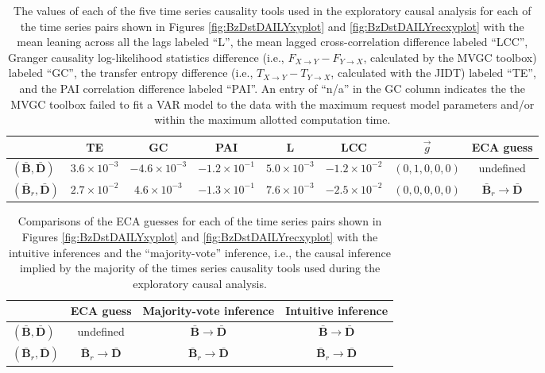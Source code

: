 \documentclass{article}[10pt]
\begin{document}
\begin{table}
\begin{center}
\begin{tabular}{lccccccc}
  & TE & GC & PAI & L & LCC & $\vec{g}$ & ECA guess\\
\midrule
$(\bar{\mathbf{B}},\bar{\mathbf{D}})$ & $3.6\times 10^{-3}$ & $-4.6\times 10^{-3}$ & $-1.2\times 10^{-1}$ & $5.0\times 10^{-3}$ & $-1.2\times 10^{-2}$ & $(0,1,0,0,0)$ & undefined\\
$(\bar{\mathbf{B}}_r,\bar{\mathbf{D}})$ & $2.7\times 10^{-2}$ & $4.6\times 10^{-3}$ & $-1.3\times 10^{-1}$ & $7.6\times 10^{-3}$ & $-2.5\times 10^{-2}$ & $(0,0,0,0,0)$ & $\bar{\mathbf{B}}_r\rightarrow\bar{\mathbf{D}}$
\end{tabular}
\caption{The values of each of the five time series causality tools used in the exploratory causal analysis for each of the time series pairs shown in Figures \ref{fig:BzDstDAILYxyplot} and \ref{fig:BzDstDAILYrecxyplot} with the mean leaning across all the lags labeled ``L'', the mean lagged cross-correlation difference labeled ``LCC'', Granger causality log-likelihood statistics difference (i.e., $F_{X\rightarrow Y}-F_{Y\rightarrow X}$, calculated by the MVGC toolbox) labeled ``GC'', the transfer entropy difference (i.e., $T_{X\rightarrow Y}-T_{Y\rightarrow X}$, calculated with the JIDT) labeled ``TE'', and the PAI correlation difference labeled ``PAI''.  An entry of ``n/a'' in the GC column indicates the the MVGC toolbox failed to fit a VAR model to the data with the maximum request model parameters and/or within the maximum allotted computation time.}
\label{tab:SolEx}
\end{center}
\end{table}
\begin{table}
\begin{center}
\begin{tabular}{lccc}
  & ECA guess & Majority-vote inference & Intuitive inference\\
\midrule
$(\bar{\mathbf{B}},\bar{\mathbf{D}})$ & undefined & $\bar{\mathbf{B}}\rightarrow\bar{\mathbf{D}}$ & $\bar{\mathbf{B}}\rightarrow\bar{\mathbf{D}}$\\
$(\bar{\mathbf{B}}_r,\bar{\mathbf{D}})$ & $\bar{\mathbf{B}}_r\rightarrow\bar{\mathbf{D}}$ & $\bar{\mathbf{B}}_r\rightarrow\bar{\mathbf{D}}$ & $\bar{\mathbf{B}}_r\rightarrow\bar{\mathbf{D}}$
\end{tabular}
\caption{Comparisons of the ECA guesses for each of the time series pairs shown in Figures \ref{fig:BzDstDAILYxyplot} and \ref{fig:BzDstDAILYrecxyplot} with the intuitive inferences and the ``majority-vote'' inference, i.e., the causal inference implied by the majority of the times series causality tools used during the exploratory causal analysis.}
\label{tab:SolExECAguess}
\end{center}
\end{table}
\end{document}
